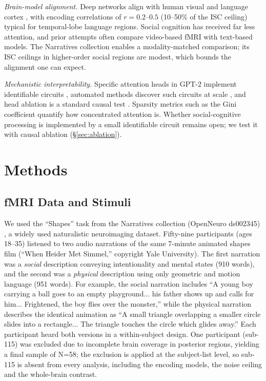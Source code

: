 \documentclass[conference]{IEEEtran}
\begin{document}
\textit{Brain-model alignment.} Deep networks align with human visual \cite{khaligh2014deep} and language cortex \cite{schrimpf2021neural, caucheteux2022brains, goldstein2022shared}, with encoding correlations of $r=0.2$--$0.5$ (10--50\% of the ISC ceiling) typical for temporal-lobe language regions. Social cognition has received far less attention, and prior attempts often compare video-based fMRI with text-based models. The Narratives collection \cite{nastase2021narratives} enables a modality-matched comparison; its ISC ceilings in higher-order social regions are modest, which bounds the alignment one can expect.

\textit{Mechanistic interpretability.} Specific attention heads in GPT-2 implement identifiable circuits \cite{wang2022interpretability}, automated methods discover such circuits at scale \cite{conmy2023towards}, and head ablation is a standard causal test \cite{elhage2021mathematical}. Sparsity metrics such as the Gini coefficient \cite{hoyer2004non} quantify how concentrated attention is. Whether social-cognitive processing is implemented by a small identifiable circuit remains open; we test it with causal ablation (\S\ref{sec:ablation}).

\section{Methods}

\subsection{fMRI Data and Stimuli}

We used the ``Shapes'' task from the Narratives collection (OpenNeuro ds002345) \cite{nastase2021narratives}, a widely used naturalistic neuroimaging dataset. Fifty-nine participants (ages 18--35) listened to two audio narrations of the same 7-minute animated shapes film (``When Heider Met Simmel,'' copyright Yale University). The first narration was a \textit{social} description conveying intentionality and mental states (910 words), and the second was a \textit{physical} description using only geometric and motion language (951 words). For example, the social narration includes ``A young boy carrying a ball goes to an empty playground... his father shows up and calls for him... Frightened, the boy flies over the monster,'' while the physical narration describes the identical animation as ``A small triangle overlapping a smaller circle slides into a rectangle... The triangle touches the circle which glides away.'' Each participant heard both versions in a within-subject design. One participant (sub-115) was excluded due to incomplete brain coverage in posterior regions, yielding a final sample of N=58; the exclusion is applied at the subject-list level, so sub-115 is absent from every analysis, including the encoding models, the noise ceiling and the whole-brain contrast.
\end{document}
